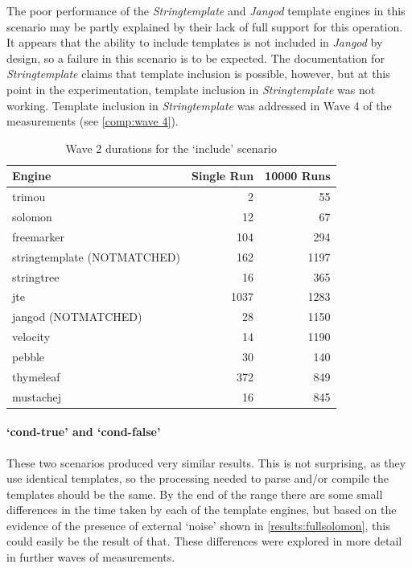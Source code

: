 The poor performance of the \emph{Stringtemplate} and \emph{Jangod} template engines in this scenario may be partly explained by their lack of full support for this operation. It appears that the ability to include templates is not included in \emph{Jangod} by design, so a failure in this scenario is to be expected. The documentation for \emph{Stringtemplate} claims that template inclusion is possible, however, but at this point in the experimentation, template inclusion in \emph{Stringtemplate} was not working. Template inclusion in \emph{Stringtemplate} was addressed in Wave 4 of the measurements (see \autoref{comp:wave 4}).

\begin{table}[ht!]
\centering
\begin{tabular}{lrr}
\textbf{Engine} & \textbf{Single Run} & \textbf{10000 Runs} \\
\hline
trimou & 2 & 55 \\
solomon & 12 & 67 \\
freemarker & 104 & 294 \\
stringtemplate (NOTMATCHED) & 162 & 1197 \\
stringtree & 16 & 365 \\
jte & 1037 & 1283 \\
jangod (NOTMATCHED) & 28 & 1150 \\
velocity & 14 & 1190 \\
pebble & 30 & 140 \\
thymeleaf & 372 & 849 \\
mustachej & 16 & 845 \\
\end{tabular}
\caption{Wave 2 durations for the `include' scenario\label{w2:results:include}}
\end{table}

\paragraph{`cond-true' and `cond-false'}

These two scenarios produced very similar results. This is not surprising, as they use identical templates, so the processing needed to parse and/or compile the templates should be the same. By the end of the range there are some small differences in the time taken by each of the template engines, but based on the evidence of the presence of external `noise' shown in \autoref{results:fullsolomon}, this could easily be the result of that. These differences were explored in more detail in further waves of measurements.

